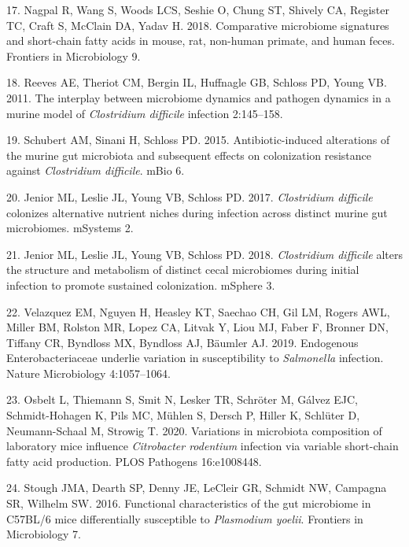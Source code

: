 \documentclass[
  11pt,
]{article}
\begin{document}
\leavevmode\hypertarget{ref-Nagpal2018}{}%
17. Nagpal R, Wang S, Woods LCS, Seshie O, Chung ST, Shively CA,
Register TC, Craft S, McClain DA, Yadav H. 2018. Comparative microbiome
signatures and short-chain fatty acids in mouse, rat, non-human primate,
and human feces. Frontiers in Microbiology 9.

\leavevmode\hypertarget{ref-Reeves2011}{}%
18. Reeves AE, Theriot CM, Bergin IL, Huffnagle GB, Schloss PD, Young
VB. 2011. The interplay between microbiome dynamics and pathogen
dynamics in a murine model of \emph{Clostridium difficile} infection
2:145--158.

\leavevmode\hypertarget{ref-Schubert2015}{}%
19. Schubert AM, Sinani H, Schloss PD. 2015. Antibiotic-induced
alterations of the murine gut microbiota and subsequent effects on
colonization resistance against \emph{Clostridium difficile}. mBio 6.

\leavevmode\hypertarget{ref-Jenior2017}{}%
20. Jenior ML, Leslie JL, Young VB, Schloss PD. 2017. \emph{Clostridium
difficile} colonizes alternative nutrient niches during infection across
distinct murine gut microbiomes. mSystems 2.

\leavevmode\hypertarget{ref-Jenior2018}{}%
21. Jenior ML, Leslie JL, Young VB, Schloss PD. 2018. \emph{Clostridium
difficile} alters the structure and metabolism of distinct cecal
microbiomes during initial infection to promote sustained colonization.
mSphere 3.

\leavevmode\hypertarget{ref-Velazquez2019}{}%
22. Velazquez EM, Nguyen H, Heasley KT, Saechao CH, Gil LM, Rogers AWL,
Miller BM, Rolston MR, Lopez CA, Litvak Y, Liou MJ, Faber F, Bronner DN,
Tiffany CR, Byndloss MX, Byndloss AJ, Bäumler AJ. 2019. Endogenous
Enterobacteriaceae underlie variation in susceptibility to
\emph{Salmonella} infection. Nature Microbiology 4:1057--1064.

\leavevmode\hypertarget{ref-Osbelt2020}{}%
23. Osbelt L, Thiemann S, Smit N, Lesker TR, Schröter M, Gálvez EJC,
Schmidt-Hohagen K, Pils MC, Mühlen S, Dersch P, Hiller K, Schlüter D,
Neumann-Schaal M, Strowig T. 2020. Variations in microbiota composition
of laboratory mice influence \emph{Citrobacter rodentium} infection via
variable short-chain fatty acid production. PLOS Pathogens 16:e1008448.

\leavevmode\hypertarget{ref-Stough2016}{}%
24. Stough JMA, Dearth SP, Denny JE, LeCleir GR, Schmidt NW, Campagna
SR, Wilhelm SW. 2016. Functional characteristics of the gut microbiome
in C57BL/6 mice differentially susceptible to \emph{Plasmodium yoelii}.
Frontiers in Microbiology 7.
\end{document}
